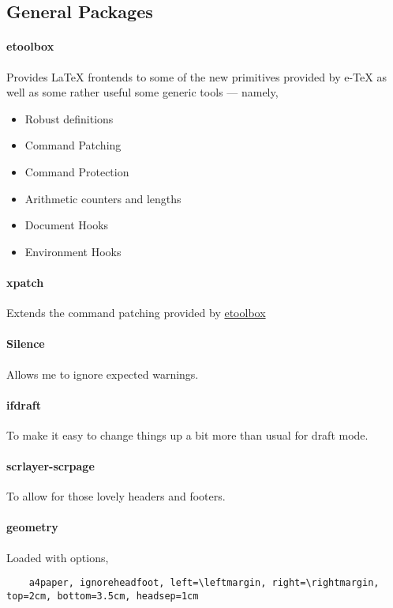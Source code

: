 \documentclass[solid,math,chem,code,plot,gloss]{bmc}
\begin{document}
\subsection{General Packages}

\paragraph{\ttfamily etoolbox}\label{par:etoolbox}
Provides LaTeX frontends to some of the new primitives provided by e-TeX
as well as some rather useful some generic tools --- namely,
\begin{itemize}
    \item Robust definitions
    \item Command Patching
    \item Command Protection
    \item Arithmetic counters and lengths
    \item Document Hooks
    \item Environment Hooks
\end{itemize}
\paragraph{\ttfamily xpatch}\label{par:xpatch}
Extends the command patching provided by \hyperref[par:etoolbox]{etoolbox}
\paragraph{\ttfamily Silence}\label{par:Silence}
Allows me to ignore expected warnings.
\paragraph{\ttfamily ifdraft}\label{par:ifdraft}
To make it easy to change things up a bit more than usual for draft mode.
\paragraph{\ttfamily scrlayer-scrpage}\label{par:scrlayer-scrpage}
To allow for those lovely headers and footers.
\paragraph{\ttfamily geometry}\label{par:geometry}
Loaded with options,
\begin{verbatim}
    a4paper, ignoreheadfoot, left=\leftmargin, right=\rightmargin, top=2cm, bottom=3.5cm, headsep=1cm
\end{verbatim}
\end{document}
